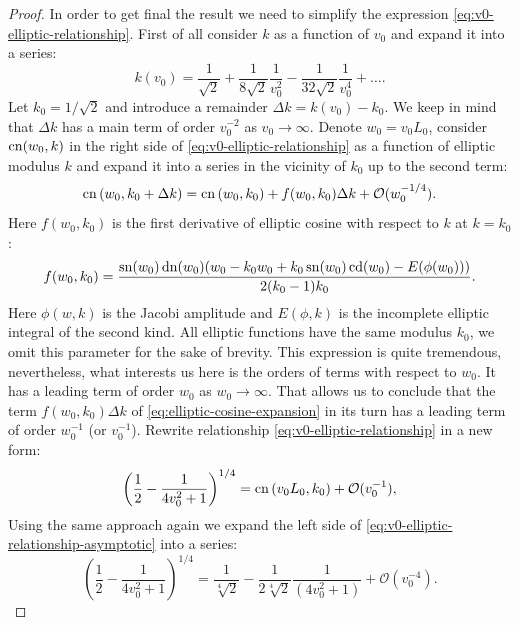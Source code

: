 \begin{proof}
	In order to get final the result we need to simplify the expression \eqref{eq:v0-elliptic-relationship}.
	First of all consider $k$ as a function of $v_0$ and expand it into a series:
	\begin{equation}
		k(v_0) = \frac{1}{\sqrt{2}} + \frac{1}{8 \sqrt{2}} \frac{1}{v_0^2} - \frac{1}{32 \sqrt{2}} \frac{1}{v_0^4} + \dots.
	\label{eq:k-series}
	\end{equation}
	Let $k_0 = 1/\sqrt{2}$ and introduce a remainder $\Delta k = k(v_0) - k_0$.
	We keep in mind that $\Delta k$ has a main term of order $v_0^{-2}$ as $v_0 \to \infty$.
	Denote $w_0 = v_0 L_0$, consider $\mathrm{cn}(w_0, k)$ in the right side of \eqref{eq:v0-elliptic-relationship} as a function of elliptic modulus $k$ and expand it into a series in the vicinity of $k_0$ up to the second term:
	\begin{equation}
		\mathrm{cn} \left( w_0, k_0 + \Delta k \right) = \mathrm{cn} \left( w_0, k_0 \right) + f(w_0, k_0) \Delta k + \mathcal{O}(w_0^{-1/4}).
	\label{eq:elliptic-cosine-expansion}
	\end{equation}
	Here $f(w_0, k_0)$ is the first derivative of elliptic cosine with respect to $k$ at $k = k_0$:
	\begin{equation}
		f(w_0, k_0) = \frac{\mathop\mathrm{sn} (w_0) \mathop\mathrm{dn} (w_0) (w_0 - k_0 w_0 + k_0 \mathop\mathrm{sn}(w_0) \mathop\mathrm{cd}(w_0) - E(\phi(w_0))) }{2 (k_0 - 1) k_0} .
	\end{equation}
	Here $\phi(w, k)$ is the Jacobi amplitude and $E(\phi, k)$ is the incomplete elliptic integral of the second kind.
	All elliptic functions have the same modulus $k_0$, we omit this parameter for the sake of brevity.
	This expression is quite tremendous, nevertheless, what interests us here is the orders of terms with respect to $w_0$.
	It has a leading term of order $w_0$ as $w_0 \to \infty$.
	That allows us to conclude that the term $f(w_0, k_0) \Delta k$ of \eqref{eq:elliptic-cosine-expansion} in its turn has a leading term of order $w_0^{-1}$ (or $v_0^{-1}$).
	Rewrite relationship \eqref{eq:v0-elliptic-relationship} in a new form:
	\begin{equation}
		\left( \frac{1}{2} - \frac{1}{4 v_0^2 + 1} \right)^{1/4} = \mathrm{cn} \left( v_0 L_0, k_0 \right) + \mathcal{O}(v_0^{-1}),
	\label{eq:v0-elliptic-relationship-asymptotic}
	\end{equation}
	Using the same approach again we expand the left side of \eqref{eq:v0-elliptic-relationship-asymptotic} into a series:
	\begin{equation}
		\left( \frac{1}{2} - \frac{1}{4 v_0^2 + 1} \right)^{1/4} =  \frac{1}{\sqrt[4]{2}} - \frac{1}{2 \sqrt[4]{2}} \frac{1}{(4v_0^2 + 1)} + \mathcal{O}(v_0^{-4}).

\end{equation}
\end{proof}
